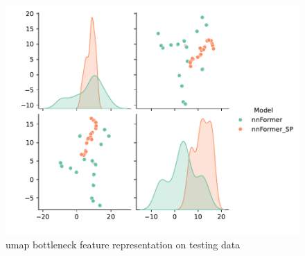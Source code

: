 \begin{figure}[htb!] %
\centering
\centering
\includegraphics[width=1\textwidth]{images/Umap_test.pdf}
\caption{\centering \gls{umap} bottleneck feature representation on testing data}
\label{Fig:umap test}
\end{figure}

